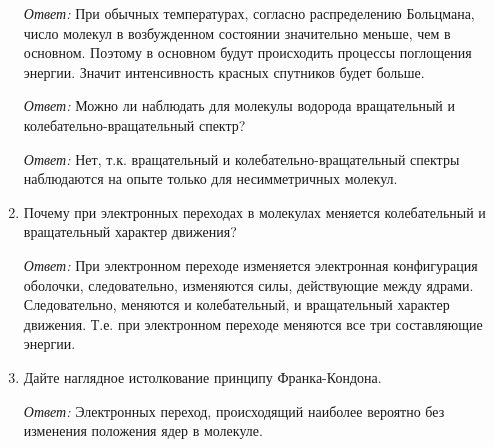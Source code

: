 \begin{enumerate}
\emph{Ответ:}
При обычных температурах, согласно распределению Больцмана, число молекул в
возбужденном состоянии значительно меньше, чем в основном. Поэтому в основном
будут происходить процессы поглощения энергии. Значит интенсивность красных
спутников будет больше.

\emph{Ответ:}
Можно ли наблюдать для молекулы водорода вращательный и
колебательно-вращательный спектр?
        
\emph{Ответ:}
Нет, т.к. вращательный и колебательно-вращательный спектры наблюдаются на опыте
только для несимметричных молекул.

\item Почему при электронных переходах в молекулах меняется колебательный и
вращательный характер движения?

\emph{Ответ:} При электронном переходе изменяется электронная конфигурация
оболочки, следовательно, изменяются силы, действующие между ядрами.
Следовательно, меняются и колебательный, и вращательный характер движения. Т.е.
при электронном переходе меняются все три составляющие энергии.

\item Дайте наглядное истолкование принципу Франка-Кондона.

\emph{Ответ:}
Электронных переход, происходящий наиболее вероятно без изменения положения ядер
в молекуле.

\end{enumerate}
